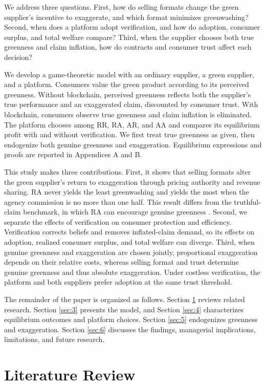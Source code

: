 \documentclass[preprint,review,12pt,authoryear,nopreprintline]{elsarticle}
\theoremstyle{definition}
\begin{document}
We address three questions. First, how do selling formats change the green supplier's incentive to exaggerate, and which format minimizes greenwashing? Second, when does a platform adopt verification, and how do adoption, consumer surplus, and total welfare compare? Third, when the supplier chooses both true greenness and claim inflation, how do contracts and consumer trust affect each decision?

We develop a game-theoretic model with an ordinary supplier, a green supplier, and a platform. Consumers value the green product according to its perceived greenness. Without blockchain, perceived greenness reflects both the supplier's true performance and an exaggerated claim, discounted by consumer trust. With blockchain, consumers observe true greenness and claim inflation is eliminated. The platform chooses among RR, RA, AR, and AA and compares its equilibrium profit with and without verification. We first treat true greenness as given, then endogenize both genuine greenness and exaggeration. Equilibrium expressions and proofs are reported in Appendices A and B.

This study makes three contributions. First, it shows that selling formats alter the green supplier's return to exaggeration through pricing authority and revenue sharing. RA never yields the least greenwashing and yields the most when the agency commission is no more than one half. This result differs from the truthful-claim benchmark, in which RA can encourage genuine greenness \citep{wu2025platform}. Second, we separate the effects of verification on consumer protection and efficiency. Verification corrects beliefs and removes inflated-claim demand, so its effects on adoption, realized consumer surplus, and total welfare can diverge. Third, when genuine greenness and exaggeration are chosen jointly, proportional exaggeration depends on their relative costs, whereas selling format and trust determine genuine greenness and thus absolute exaggeration. Under costless verification, the platform and both suppliers prefer adoption at the same trust threshold.

The remainder of the paper is organized as follows. Section \ref{sec:2} reviews related research. Section \ref{sec:3} presents the model, and Section \ref{sec:4} characterizes equilibrium outcomes and platform choices. Section \ref{sec:5} endogenizes greenness and exaggeration. Section \ref{sec:6} discusses the findings, managerial implications, limitations, and future research.

\section{Literature Review}\label{sec:2}
\end{document}
